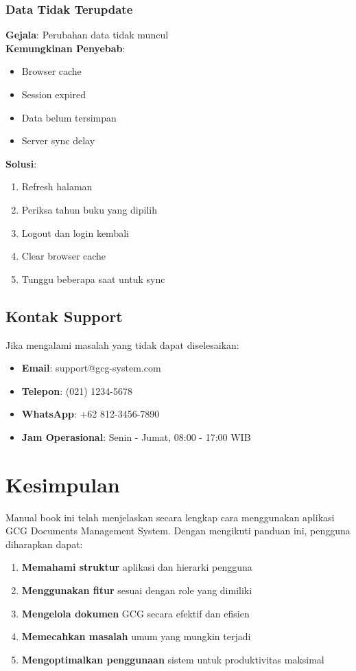 \documentclass[12pt,a4paper]{article}
\begin{document}
\subsubsection{Data Tidak Terupdate}
\textbf{Gejala}: Perubahan data tidak muncul\\
\textbf{Kemungkinan Penyebab}:
\begin{itemize}
\item Browser cache
\item Session expired
\item Data belum tersimpan
\item Server sync delay
\end{itemize}
\textbf{Solusi}:
\begin{enumerate}
\item Refresh halaman
\item Periksa tahun buku yang dipilih
\item Logout dan login kembali
\item Clear browser cache
\item Tunggu beberapa saat untuk sync
\end{enumerate}

\subsection{Kontak Support}
Jika mengalami masalah yang tidak dapat diselesaikan:
\begin{itemize}
\item \textbf{Email}: support@gcg-system.com
\item \textbf{Telepon}: (021) 1234-5678
\item \textbf{WhatsApp}: +62 812-3456-7890
\item \textbf{Jam Operasional}: Senin - Jumat, 08:00 - 17:00 WIB
\end{itemize}

\section{Kesimpulan}

Manual book ini telah menjelaskan secara lengkap cara menggunakan aplikasi GCG Documents Management System. Dengan mengikuti panduan ini, pengguna diharapkan dapat:

\begin{enumerate}
\item \textbf{Memahami struktur} aplikasi dan hierarki pengguna
\item \textbf{Menggunakan fitur} sesuai dengan role yang dimiliki
\item \textbf{Mengelola dokumen} GCG secara efektif dan efisien
\item \textbf{Memecahkan masalah} umum yang mungkin terjadi
\item \textbf{Mengoptimalkan penggunaan} sistem untuk produktivitas maksimal
\end{enumerate}
\end{document}
